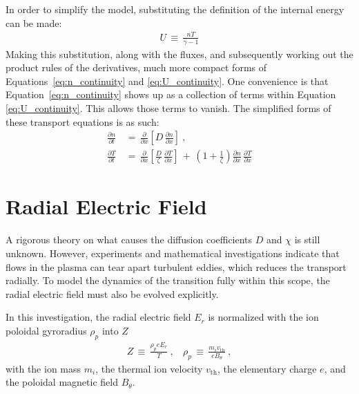 In order to simplify the model, substituting the definition of the internal energy can be made:
\begin{align} %
	U \,\equiv\, \frac{n T}{\gamma - 1} \label{eq:U_definition}
\end{align}
Making this substitution, along with the fluxes, and subsequently working out the product rules of the derivatives, much more compact forms of Equations~\ref{eq:n_continuity} and \ref{eq:U_continuity}.
One convenience is that Equation~\ref{eq:n_continuity} shows up as a collection of terms within Equation \ref{eq:U_continuity}.
This allows those terms to vanish.
The simplified forms of these transport equations is as such:
\begin{align} %
	\frac{\partial n}{\partial t} \,&=\, \frac{\partial}{\partial x} \left[D \, \frac{\partial n}{\partial x}\right]~,\label{eq:n_compact} \\
	\frac{\partial T}{\partial t} \,&=\, \frac{\partial}{\partial x} \left[\frac{D}{\zeta} \, \frac{\partial T}{\partial x}\right] \,+\, \left(1 + \frac{1}{\zeta}\right) \frac{\partial n}{\partial x} \, \frac{\partial T}{\partial x} \label{eq:T_compact}
\end{align}

\section{Radial Electric Field}\label{sec:Z_equation}
A rigorous theory on what causes the diffusion coefficients $D$ and $\chi$ is still unknown.
However, experiments and mathematical investigations indicate that flows in the plasma can tear apart turbulent eddies, which reduces the transport radially.\todo{\color{red}{Reword?}}
To model the dynamics of the transition fully within this scope, the radial electric field must also be evolved explicitly.

In this investigation, the radial electric field $E_r$ is normalized with the ion poloidal gyroradius $\rho_p$ into $Z$
\begin{align} %
	Z \,\equiv\, \frac{\rho_p e E_r}{T}~, ~~~~ \rho_p \,\equiv\, \frac{m_i v_\text{th}}{e B_\theta}~,\label{eq:Z_and_rho_definitions}
\end{align}
with the ion mass $m_i$, the thermal ion velocity $v_\text{th}$, the elementary charge $e$, and the poloidal magnetic field $B_\theta$.

